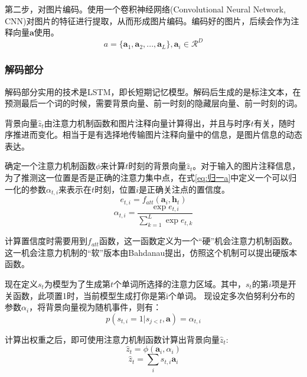 第二步，对图片编码。使用一个卷积神经网络(Convolutional Neural Network, CNN)对图片的特征进行提取，从而形成图片编码。编码好的图片，后续会作为注释向量$\textbf{a}$使用。
$$a = \{\textbf{a}_1, \textbf{a}_2, ... , \textbf{a}_L\}, \textbf{a}_i \in \mathcal{R}^D$$

\subsubsection{解码部分}
解码部分实用的技术是LSTM，即长短期记忆模型。解码后生成的是标注文本，在预测最后一个词的时候，需要背景向量、前一时刻的隐藏层向量、前一时刻的词。

背景向量$\hat{z}_t$由注意力机制函数和图片注释向量计算得出，并且与时序$t$有关，随时序推进而变化。相当于是有选择地传输图片注释向量中的信息，是图片信息的动态表达。

确定一个注意力机制函数$\phi$来计算$t$时刻的背景向量$\hat{z}_t$。对于输入的图片注释信息，为了推测这一位置是否是正确的注意力集中点，在式\eqref{eq:归一a}中定义一个可以归一化的参数$\alpha_{t,i}$来表示在$t$时刻，位置$i$是正确关注点的置信度。
\begin{equation}
    e_{t,i}=f_{att}(\textbf{a}_i,\textbf{h}_t)
\end{equation}
\begin{equation}
    \label{eq:归一a}
    \alpha_{t,i}=\frac{\exp e_{t,i}}{\sum_{k=1}^{L}\exp e_{t,k}}
\end{equation}

计算置信度时需要用到$f_{att}$函数，这一函数定义为一个“硬”机会注意力机制函数。
这一机会注意力机制的“软”版本由Bahdanau提出，仿照这个机制可以提出硬版本函数。

现在定义$s_t$为模型为了生成第$t$个单词所选择的注意力区域。其中，$s_t$的第$i$项是开关函数，此项置1时，当前模型生成打你是第i个单词。
现设定多次伯努利分布的参数${\alpha_i}$，将背景向量视为随机事件，则有：
\begin{equation}
    p(s_{t,i} = 1|s_{j<t}, \textbf{a}) = \alpha_{t,i}
\end{equation}

计算出权重之后，即可使用注意力机制函数计算出背景向量$\hat{z}_t$:
\begin{equation}
    \hat{z}_t=\phi(\textbf{a}_i,\alpha_i)
\end{equation}
\begin{equation}
    \hat{z}_t = \sum_i s_{t,i}\textbf{a}_i
\end{equation}

